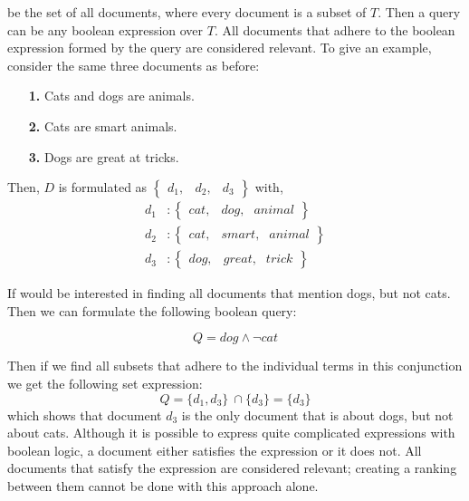 be the set of all documents, where every document is a subset of $T$. Then a query can be any boolean expression over $T$. All documents that adhere to the boolean expression formed by the query are considered relevant. To give an example, consider the same three documents as before:

\begin{itemize}
	\item[\textbf{1.}] Cats and dogs are animals.
	\item[\textbf{2.}] Cats are smart animals.
	\item[\textbf{3.}] Dogs are great at tricks. 
\end{itemize}
Then, $D$ is formulated as $\left\{
\begin{smallmatrix}
		d_1, & d_2, & d_3 
\end{smallmatrix}
\right\}$ with,
\begin{align}
d_1&: \begin{Bmatrix}
	\mathit{cat}, & \textit{dog}, & \textit{animal}
\end{Bmatrix}\\
d_2&: \begin{Bmatrix}
	\mathit{cat}, & \textit{smart}, & \textit{animal}
\end{Bmatrix}\\
d_3&: \begin{Bmatrix}
\mathit{dog}, & \textit{great}, & \textit{trick}
\end{Bmatrix}
\end{align}

If would be interested in finding all documents that mention dogs, but not cats. Then we can formulate the following boolean query:

\begin{equation}
	Q = \mathit{dog} \land \neg \mathit{cat}
\end{equation}

Then if we find all subsets that adhere to the individual terms in this conjunction we get the following set expression:
\begin{equation}
Q = \{d_1, d_3\}\ \cap \{d_3\} = \{d_3\}
\end{equation}
which shows that document $d_3$ is the only document that is about dogs, but not about cats. Although it is possible to express quite complicated expressions with boolean logic, a document either satisfies the expression or it does not. All documents that satisfy the expression are considered relevant; creating a ranking between them cannot be done with this approach alone. 


